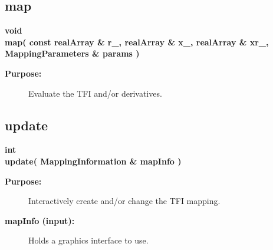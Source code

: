 \subsection{map}
 
\begin{flushleft} \textbf{%
void  \\ 
\settowidth{\TFIMappingIncludeArgIndent}{map(}%
map( const realArray \& r\_, realArray \& x\_, realArray \& xr\_, MappingParameters \& params )
}\end{flushleft}
\begin{description}
\item[{\bf Purpose:}]  Evaluate the TFI and/or derivatives. 
\end{description}
\subsection{update}
 
\begin{flushleft} \textbf{%
int  \\ 
\settowidth{\TFIMappingIncludeArgIndent}{update(}%
update( MappingInformation \& mapInfo ) 
}\end{flushleft}
\begin{description}
\item[{\bf Purpose:}]  Interactively create and/or change the TFI mapping.
\item[{\bf mapInfo (input):}]  Holds a graphics interface to use.
\end{description}
